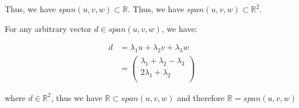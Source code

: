 \documentclass[11pt]{article}
\begin{document}
Thus, we have $span(u, v, w) \subset \mathbb{R}$.
Thus, we have $span(u, v, w) \subset \mathbb{R}^2$.

For any arbitrary vector $d \in span(u, v, w)$, we have:

\begin{align*}
    d &= \lambda_1 u + \lambda_2 v + \lambda_3 w \\
    &= \begin{pmatrix}
        \lambda_1 + \lambda_2 - \lambda_3 \\
        2\lambda_1 + \lambda_2\\
    \end{pmatrix}
\end{align*}

where $d \in \mathbb{R}^2$, thus we have $\mathbb{R} \subset span(u, v, w)$ and therefore $\mathbb{R} = span(u, v, w)$
\end{document}
